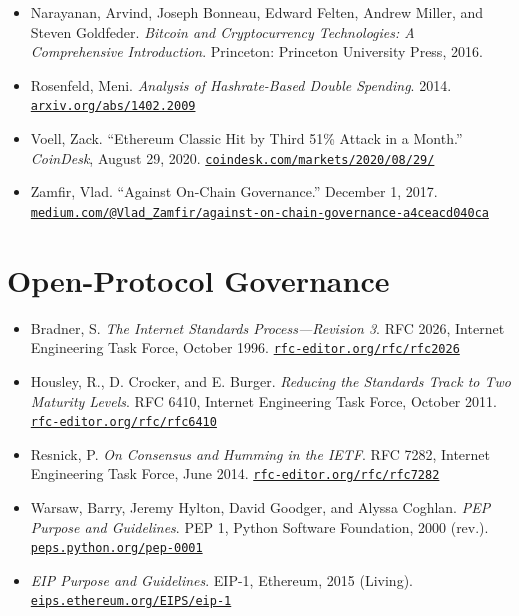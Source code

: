 \documentclass[11pt, twoside, openright]{book}
\begin{document}
\begin{itemize}[leftmargin=1.5em, itemsep=4pt]
  \item Narayanan, Arvind, Joseph Bonneau, Edward Felten, Andrew Miller, and Steven Goldfeder. \textit{Bitcoin and Cryptocurrency Technologies: A Comprehensive Introduction}. Princeton: Princeton University Press, 2016.
  \item Rosenfeld, Meni. \textit{Analysis of Hashrate-Based Double Spending}. 2014. \href{https://arxiv.org/abs/1402.2009}{\nolinkurl{arxiv.org/abs/1402.2009}}
  \item Voell, Zack. ``Ethereum Classic Hit by Third 51\% Attack in a Month.'' \textit{CoinDesk}, August 29, 2020. \href{https://www.coindesk.com/markets/2020/08/29/ethereum-classic-hit-by-third-51-attack-in-a-month}{\nolinkurl{coindesk.com/markets/2020/08/29/}}
  \item Zamfir, Vlad. ``Against On-Chain Governance.'' December 1, 2017. \href{https://medium.com/@Vlad_Zamfir/against-on-chain-governance-a4ceacd040ca}{\nolinkurl{medium.com/@Vlad_Zamfir/against-on-chain-governance-a4ceacd040ca}}
\end{itemize}

\section*{Open-Protocol Governance}
\begin{itemize}[leftmargin=1.5em, itemsep=4pt]
  \item Bradner, S. \textit{The Internet Standards Process---Revision 3}. RFC 2026, Internet Engineering Task Force, October 1996. \href{https://rfc-editor.org/rfc/rfc2026}{\nolinkurl{rfc-editor.org/rfc/rfc2026}}
  \item Housley, R., D. Crocker, and E. Burger. \textit{Reducing the Standards Track to Two Maturity Levels}. RFC 6410, Internet Engineering Task Force, October 2011. \href{https://rfc-editor.org/rfc/rfc6410}{\nolinkurl{rfc-editor.org/rfc/rfc6410}}
  \item Resnick, P. \textit{On Consensus and Humming in the IETF}. RFC 7282, Internet Engineering Task Force, June 2014. \href{https://rfc-editor.org/rfc/rfc7282}{\nolinkurl{rfc-editor.org/rfc/rfc7282}}
  \item Warsaw, Barry, Jeremy Hylton, David Goodger, and Alyssa Coghlan. \textit{PEP Purpose and Guidelines}. PEP 1, Python Software Foundation, 2000 (rev.). \href{https://peps.python.org/pep-0001}{\nolinkurl{peps.python.org/pep-0001}}
  \item \textit{EIP Purpose and Guidelines}. EIP-1, Ethereum, 2015 (Living). \href{https://eips.ethereum.org/EIPS/eip-1}{\nolinkurl{eips.ethereum.org/EIPS/eip-1}}
\end{itemize}
\end{document}
